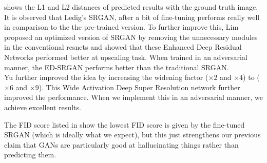 \documentclass[10pt,twocolumn,letterpaper]{article}
\begin{document}
     shows the L1 and L2 distances of predicted results with the ground truth image. It is observed that Ledig's SRGAN, after a bit of fine-tuning performs really well in comparison to the the pre-trained version. To further improve this, Lim \etal\cite{lim2017enhanced} proposed an optimized version of SRGAN by removing the unnecessary modules in the conventional resnets and showed that these Enhanced Deep Residual Networks performed better at upscaling task. When trained in an adversarial manner, the ED-SRGAN performs better than the traditional SRGAN.\\
\hspace*{0.167 in}Yu \etal\cite{yu2018wide} further improved the idea by increasing the widening factor ($\times 2$ and $\times 4$) to ($\times 6$ and $\times 9$). This Wide Activation Deep Super Resolution network further improved the performance. When we implement this in an adversarial manner, we achieve excellent results. 
    
The FID score listed in  show the lowest FID score is given by the fine-tuned SRGAN (which is ideally what we expect), but this just strengthens our previous claim that GANs are particularly good at hallucinating things rather than predicting them. 
\end{document}
